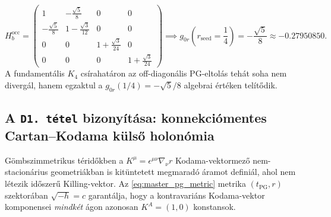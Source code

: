 \documentclass[11pt,a4paper]{article}
\theoremstyle{remark}
\begin{document}
\begin{enumerate}
  \begin{equation}
    H_b^{\mathrm{occ}} =
    \begin{pmatrix}
      1 & -\frac{\sqrt{5}}{8} & 0 & 0 \\[4pt]
      -\frac{\sqrt{5}}{8} & 1 - \frac{\sqrt{3}}{12} & 0 & 0 \\[4pt]
      0 & 0 & 1 + \frac{\sqrt{3}}{24} & 0 \\[4pt]
      0 & 0 & 0 & 1 + \frac{\sqrt{3}}{24}
    \end{pmatrix}
    \implies g_{0r}\!\left(r_{\mathrm{seed}} = \frac{1}{4}\right) = -\frac{\sqrt{5}}{8} \approx -0.27950850.
    \label{eq:hb_occ_matrix}
  \end{equation}
  A fundament\'alis $K_4$ cs\'irahat\'aron az off-diagon\'alis PG-eltol\'as teh\'at soha nem diverg\'al, hanem egzaktul a $g_{0r}(1/4) = -\sqrt{5}/8$ algebrai \'ert\'eken tel\'it\H{o}dik.
\end{enumerate}

\subsection{A \texttt{D1.\ t\'etel} bizony\'it\'asa: konnekci\'omentes Cartan--Kodama k\"uls\H{o} holon\'omia}

G\"ombszimmetrikus t\'erid\H{o}kben a $K^\mu = \epsilon^{\mu\nu}\nabla_\nu r$ Kodama-vektormez\H{o} \cite{Kodama1980,Hayward1998} nem-stacion\'arius geometri\'akban is kit\"untetett megmarad\'o \'aramot defini\'al, ahol nem l\'etezik id\H{o}szer\H{u} Killing-vektor. Az \eqref{eq:master_pg_metric} metrika $(t_{\mathrm{PG}}, r)$ szektor\'aban $\sqrt{-h} = c$ garant\'alja, hogy a kontravari\'ans Kodama-vektor komponensei \emph{mindk\'et} \'agon azonosan $K^A = (1, 0)$ konstansok.
\end{document}

